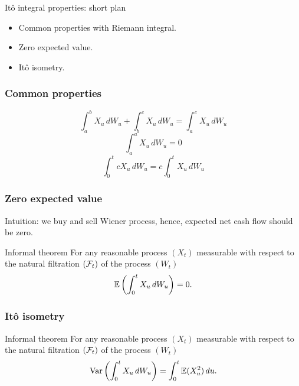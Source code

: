 


\begin{frame} %

    
    \end{frame}
    
    
    \begin{frame}{Itô integral properties: short plan}
    
      \begin{itemize}[<+->]
        \item Common properties with Riemann integral.
        \item Zero expected value.
        \item Itô isometry.
      \end{itemize}
    
    \end{frame}


\begin{frame}
        \frametitle{Common properties}

        \[
        \int_a^b X_u \, dW_u  + \int_b^c X_u \, dW_u =  \int_a^c X_u \, dW_u    
        \]
        \pause 
        \[
        \int_a^a X_u \, dW_u = 0    
        \]
        \pause
        \[
        \int_0^t c X_u \, dW_u = c\int_0^t X_u \, dW_u    
        \]
    
\end{frame}


\begin{frame}
    \frametitle{Zero expected value}

    Intuition: we buy and sell Wiener process, hence, expected net cash flow should be zero.

    \pause
\begin{block}{Informal theorem\informalduck}
For any reasonable process $(X_t)$ measurable with respect to the natural filtration $(\mathcal{F}_t)$ of the process $(W_t)$
\[
\mathbb{E}\left(\int_0^t X_u \, dW_u \right)  = 0.   
\]
\end{block}

\end{frame}

    
\begin{frame}
    \frametitle{Itô isometry}

\begin{block}{Informal theorem\informalduck}
        For any reasonable process $(X_t)$ measurable with respect to the natural filtration $(\mathcal{F}_t)$ of the process $(W_t)$
        \[
        \operatorname{Var}\left(\int_0^t X_u \, dW_u \right)  = \int_0^t \mathbb{E}(X_u^2) \, du.   
        \]
\end{block}
            
\end{frame}



